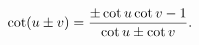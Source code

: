 \[\mathop{\cot\/}\nolimits\!\left(u\pm v\right)=\frac{\pm\mathop{\cot\/}%
\nolimits u\mathop{\cot\/}\nolimits v-1}{\mathop{\cot\/}\nolimits u\pm\mathop{%
\cot\/}\nolimits v}.\]